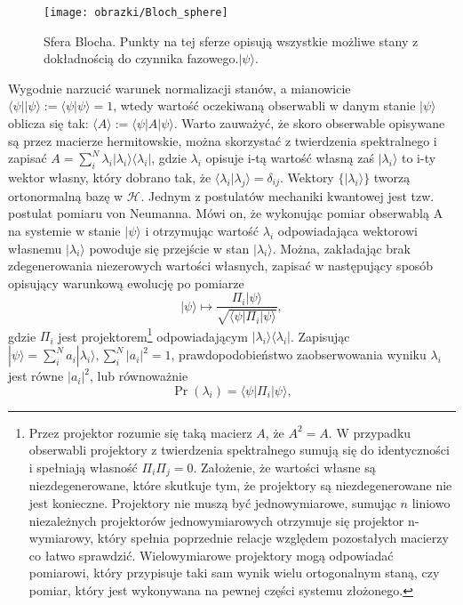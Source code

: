 \documentclass[10pt]{article} %
\newcommand{\Hx}[1]{\mathcal{H}^{#1}}
\newcommand{\Pro}[1]{\Pr(#1)}
\newcommand{\Ket}[1]{|#1\rangle}
\newcommand{\Bra}[1]{\langle#1|}
\newcommand{\Braket}[1]{\langle#1\rangle}
\newcommand{\KP}{\Ket{\psi}}
\newcommand{\BP}{\Bra{\psi}}
\begin{document}
\begin{figure}[t]
\centering
\texttt{[image: obrazki/Bloch\_sphere]}
\caption{Sfera Blocha. Punkty na tej sferze opisują wszystkie możliwe stany z dokładnością do czynnika fazowego.$\KP$.}
\label{fig:bloch}
\end{figure}
Wygodnie narzucić warunek normalizacji stanów, a mianowicie $\Bra{\psi}\Ket{\psi} := \Braket{\psi|\psi} = 1$, wtedy wartość oczekiwaną obserwabli w danym stanie $\Ket{\psi}$ oblicza się tak: $\Braket{A} := \Bra{\psi}A\Ket{\psi}$. Warto zauważyć, że skoro obserwable opisywane są przez macierze hermitowskie, można 
skorzystać z twierdzenia spektralnego i zapisać $A = \sum_i^N \lambda_i \Ket{\lambda_i}\Bra{\lambda_i}$, gdzie $\lambda_i$ opisuje i-tą wartość własną zaś $\Ket{\lambda_i}$ to i-ty wektor własny, który dobrano tak, że $\Braket{\lambda_i|\lambda_j} = \delta_{ij}$. Wektory $\{\Ket{\lambda_i}\}$ tworzą ortonormalną bazę w $\Hx{}$. Jednym z postulatów mechaniki kwantowej jest tzw. postulat pomiaru von Neumanna. Mówi on, że wykonując pomiar obserwablą A na systemie w stanie $\Ket{\psi}$ i otrzymując wartość $\lambda_i$ odpowiadająca wektorowi własnemu $\Ket{\lambda_i}$ powoduje się przejście w stan $\Ket{\lambda_i}$. Można, zakładając brak zdegenerowania niezerowych wartości własnych, zapisać w następujący sposób opisujący warunkową ewolucję po pomiarze 
\begin{equation}
\label{eq:cond_ev}
\Ket{\psi} \mapsto \frac{\Pi_i\Ket{\psi}}{\sqrt{\Bra{\psi}\Pi_i \Ket{\psi}}},
\end{equation}
gdzie $\Pi_i$ jest projektorem\footnote{Przez projektor rozumie się taką macierz $A$, że $A^2 = A$. W przypadku obserwabli projektory z twierdzenia spektralnego sumują się do identyczności i spełniają własność $\Pi_i \Pi_j =0$. Założenie, że wartości własne są niezdegenerowane, które skutkuje tym, że projektory są niezdegenerowane nie jest konieczne. Projektory nie muszą być jednowymiarowe, sumując $n$ liniowo niezależnych projektorów jednowymiarowych otrzymuje się projektor n-wymiarowy, który spełnia poprzednie relacje względem pozostałych macierzy co łatwo sprawdzić. Wielowymiarowe projektory mogą odpowiadać pomiarowi, który przypisuje taki sam wynik wielu ortogonalnym staną, czy pomiar, który jest wykonywana na pewnej części systemu złożonego.} odpowiadającym $\Ket{\lambda_i}\Bra{\lambda_i}$. Zapisując $\KP = \sum^N_i a_i \Ket{\lambda_i}, \sum^N_i |a_i|^2=1$, prawdopodobieństwo zaobserwowania wyniku $\lambda_i$ jest równe $|a_i|^2$, lub równoważnie
\begin{equation}
\Pro{\lambda_i} = \BP \Pi_i \KP,
\end{equation}
\end{document}
